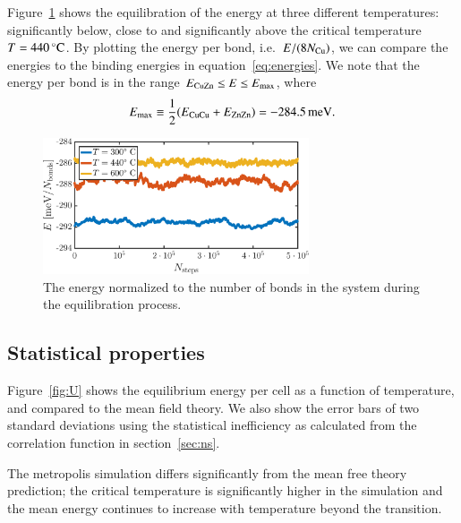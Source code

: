 Figure~\ref{fig:T2:equil} shows the equilibration of the energy at three different temperatures: significantly below, close to and significantly above the critical temperature $T = \unit[440]{^\circ C}$. By plotting the energy per bond, i.e.\  $E/(8 N_{\rm Cu})$, we can compare the energies to the binding energies in equation~\eqref{eq:energies}. 
We note that the energy per bond is in the range $E_{\rm CuZn} \leq E \leq E_{\rm max}$, where
\begin{equation}
 E_{\rm max} \equiv \frac{1}{2}(E_{\rm CuCu} + E_{\rm ZnZn}) = \unit[-284.5]{meV}.
 \label{eq:Emax}
\end{equation}

\begin{figure}[!ht]
\begin{center}
  \includegraphics[width=0.7\textwidth]{../figures/equilibration} 
  \caption{The energy normalized to the number of bonds in the system during the equilibration process.}
  \label{fig:T2:equil}
\end{center}
\end{figure}

\subsection*{Statistical properties}
Figure~\ref{fig:U} shows the equilibrium energy per cell as a function of temperature, and compared to the mean field theory. We also show the error bars of two standard deviations using the statistical inefficiency  as calculated from the correlation function in section~\ref{sec:ns}. 


The metropolis simulation differs significantly from the mean free theory prediction; the critical temperature is significantly higher in the simulation and the mean energy continues to increase with temperature beyond the transition. 

